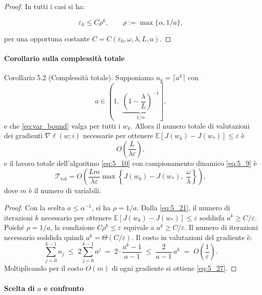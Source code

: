 \documentclass[a4paper,12pt]{article}
\numberwithin{equation}{section}
\numberwithin{figure}{section}
\numberwithin{table}{section}
\begin{document}
\begin{proof}
In tutti i casi si ha:

\begin{equation}
\varepsilon_k \le C \rho^k, \qquad \rho := \max\{\alpha, 1/a\}, \tag{5.25}\label{eq:5_25}
\end{equation}

per una opportuna costante $C = C(\varepsilon_0, \omega, \lambda, L, a)$.

\end{proof}

\paragraph{Corollario sulla complessità totale}

\begin{corollarybox}
  Corollario 5.2 (Complessità totale).
  Supponiamo \(n_k = \lceil a^k \rceil\) con
  \[
  a \in \left(1,\; \underbrace{\left(1 - \frac{\lambda}{L}\right)^{-1}}_{1/\alpha}\right],
  \]
  e che \eqref{eq:var_bound} valga per tutti i \(w_k\). Allora il numero totale di valutazioni dei gradienti \(\nabla \ell(w;i)\) necessarie per ottenere \(\mathbb{E}[J(w_k) - J(w_*)] \le \varepsilon\) è
  \[
  O\!\left(\frac{L}{\lambda \varepsilon}\right), \tag{5.26}\label{eq:5_26}
  \]
  e il lavoro totale dell'algoritmo \eqref{eq:5_10} con campionamento dinamico \eqref{eq:5_9} è
  \[
  \mathcal{T}_{\mathrm{tot}} = O\!\left(\frac{L m}{\lambda \varepsilon} \max\left\{J(w_0) - J(w_*),\; \frac{\omega}{\lambda}\right\}\right), \tag{5.27}\label{eq:5_27}
  \]
  dove \(m\) è il numero di variabili.
\end{corollarybox}

\begin{proof}
Con la scelta \(a \le \alpha^{-1}\), si ha \(\rho = 1/a\). Dalla \eqref{eq:5_21}, il numero di iterazioni \(k\) necessario per ottenere \(\mathbb{E}[J(w_k) - J(w_*)] \le \varepsilon\) soddisfa \(a^k \ge C/\varepsilon\). Poiché \(\rho = 1/a\), la condizione \(C\rho^k \le \varepsilon\) equivale a \(a^k \ge C/\varepsilon\). Il numero di iterazioni necessario soddisfa quindi \(a^k = \Theta(C/\varepsilon)\). Il costo in valutazioni del gradiente è:
\[
\sum_{j=0}^{k-1} n_j \;\le\; 2\sum_{j=0}^{k-1} a^j
\;=\; 2\cdot \frac{a^k - 1}{a-1}
\;\le\; \frac{2}{a-1}\, a^k
\;=\; O\!\left(\frac{1}{\varepsilon}\right).\]
Moltiplicando per il costo \(O(m)\) di ogni gradiente si ottiene \eqref{eq:5_27}.
\end{proof}

\paragraph{Scelta di \(a\) e confronto}
\end{document}

